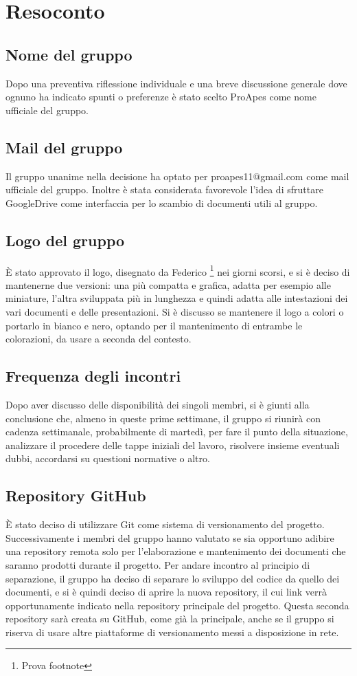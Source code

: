 \section{Resoconto}
	\label{Resoconto}
	
	\subsection{Nome del gruppo}
	Dopo una preventiva riflessione individuale e una breve discussione generale dove ognuno ha indicato spunti o preferenze è stato scelto ProApes come nome ufficiale del gruppo.
	
	\subsection{Mail del gruppo}
	Il gruppo unanime nella decisione ha optato per proapes11@gmail.com come mail ufficiale del gruppo. Inoltre è stata considerata favorevole l'idea di sfruttare GoogleDrive come interfaccia per lo scambio di documenti utili al gruppo.	
	
	\subsection{Logo del gruppo}
	È stato approvato il logo, disegnato da Federico \footnote{Prova footnote} nei giorni scorsi, e si è deciso di
	mantenerne due versioni: una più compatta e grafica, adatta per esempio alle miniature, l'altra
	sviluppata più in lunghezza e quindi adatta alle intestazioni dei vari documenti e delle
	presentazioni.
	Si è discusso se mantenere il logo a colori o portarlo in bianco e nero, optando per il
	mantenimento di entrambe le colorazioni, da usare a seconda del contesto.
	
	\subsection{ Frequenza degli incontri}
	Dopo aver discusso delle disponibilità dei singoli membri, si è giunti alla conclusione che,
	almeno in queste prime settimane, il gruppo si riunirà con cadenza settimanale, probabilmente di
	martedì, per fare il punto della situazione, analizzare il procedere delle tappe iniziali del lavoro,
	risolvere insieme eventuali dubbi, accordarsi su questioni normative o altro.

	\subsection{Repository GitHub}
	È stato deciso di utilizzare Git come sistema di versionamento del progetto. Successivamente i membri del gruppo hanno valutato se sia opportuno adibire una repository remota solo
	per l'elaborazione e mantenimento dei documenti che saranno prodotti durante il progetto. Per
	andare incontro al principio di separazione, il gruppo ha deciso di separare lo sviluppo del codice
	da quello dei documenti, e si è quindi deciso di aprire la nuova repository, il cui link verrà
	opportunamente indicato nella repository principale del progetto.
	Questa seconda repository sarà creata su GitHub, come già la principale, anche se il
	gruppo si riserva di usare altre piattaforme di versionamento messi a disposizione in rete.

